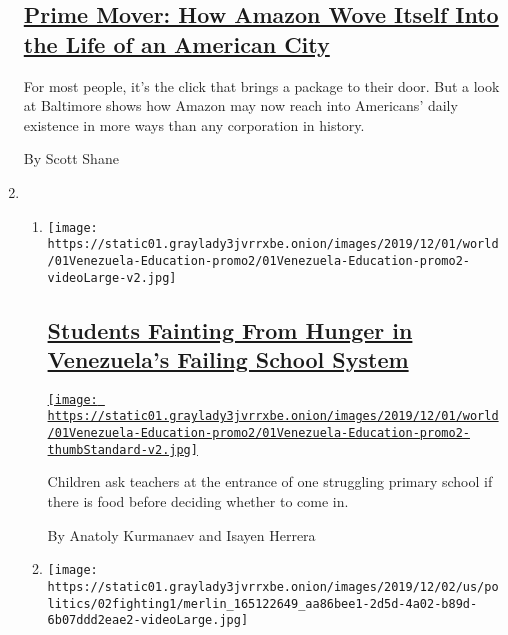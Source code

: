 \begin{enumerate}
  \hypertarget{prime-mover-how-amazon-wove-itself-into-the-life-of-an-american-city}{%
  \subsection{\texorpdfstring{\href{/2019/11/30/business/amazon-baltimore.html}{Prime
  Mover: How Amazon Wove Itself Into the Life of an American
  City}}{Prime Mover: How Amazon Wove Itself Into the Life of an American City}}\label{prime-mover-how-amazon-wove-itself-into-the-life-of-an-american-city}}

  For most people, it's the click that brings a package to their door.
  But a look at Baltimore shows how Amazon may now reach into Americans'
  daily existence in more ways than any corporation in history.

  By Scott Shane
\item
  \begin{enumerate}
  \def\labelenumii{\arabic{enumii}.}
  \item
    \texttt{[image: https://static01.graylady3jvrrxbe.onion/images/2019/12/01/world/01Venezuela-Education-promo2/01Venezuela-Education-promo2-videoLarge-v2.jpg]}

    \hypertarget{students-fainting-from-hunger-in-venezuelas-failing-school-system}{%
    \subsection{\texorpdfstring{\href{/2019/11/30/world/americas/venezuela-students-hunger.html}{Students
    Fainting From Hunger in Venezuela's Failing School
    System}}{Students Fainting From Hunger in Venezuela's Failing School System}}\label{students-fainting-from-hunger-in-venezuelas-failing-school-system}}

    \href{/2019/11/30/world/americas/venezuela-students-hunger.html}{\texttt{[image: https://static01.graylady3jvrrxbe.onion/images/2019/12/01/world/01Venezuela-Education-promo2/01Venezuela-Education-promo2-thumbStandard-v2.jpg]}}

    Children ask teachers at the entrance of one struggling primary
    school if there is food before deciding whether to come in.

    By Anatoly Kurmanaev and Isayen Herrera
  \item
    \texttt{[image: https://static01.graylady3jvrrxbe.onion/images/2019/12/02/us/politics/02fighting1/merlin\_165122649\_aa86bee1-2d5d-4a02-b89d-6b07ddd2eae2-videoLarge.jpg]}


\end{enumerate}
\end{enumerate}
